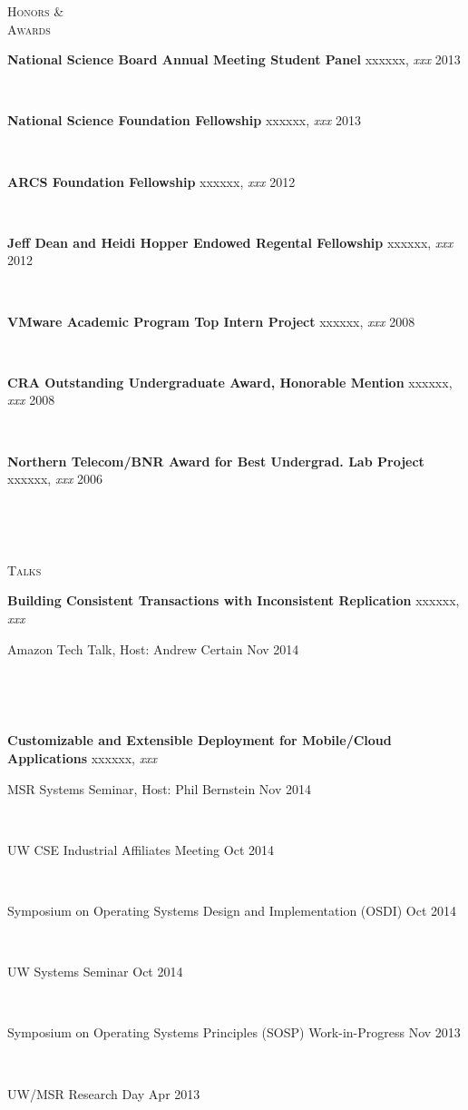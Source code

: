 \documentclass[10pt,times]{report}
\newlength{\sectiongap}
\newlength{\entrygap}
\newlength{\sectioncolwidth}
\newlength{\colgap}
\newlength{\stuffwidth}
\def\ifEqString#1#2{\def\testa{#1}\def\testb{#2}%
  \ifx\testa\testb}
\newenvironment{rtable}{
  \begin{minipage}{\textwidth}
  }{
  \end{minipage}
}
\newenvironment{rentry}[3][xxx]{
  \begin{minipage}[t]{\hsize}
    \textbf{#2}\ifEqString{#1}{xxx}\relax\else, \textit{#1}\fi
    \hspace{\stretch{1}} #3 \\
  }{
    \removelastskip
  \end{minipage}
  \\[\entrygap]  %
}
\newcommand{\rline}[2]{
  \begin{minipage}[t]{\hsize}
    #1 \hspace{\stretch{1}} #2
  \end{minipage} \\
}
\newenvironment{rsection}[1]{
  \begin{minipage}[t]{\sectioncolwidth}
    \textsc{#1}
  \end{minipage}
  \hspace{\colgap}
  \begin{minipage}[t]{\stuffwidth}
  }{
    \removelastskip
  \end{minipage}
  \\[\sectiongap]
}
\begin{document}
\begin{rtable}
\begin{rsection}{Honors \&\\Awards}
    \begin{rentry}{National Science Board Annual Meeting Student
        Panel}{2013}
    \end{rentry} \vspace{-0.5em}

    \begin{rentry}{National Science Foundation Fellowship}{2013}
    \end{rentry} \vspace{-0.5em}

    \begin{rentry}{ARCS Foundation Fellowship}{2012}
    \end{rentry} \vspace{-0.5em}

    \begin{rentry}{Jeff Dean and Heidi Hopper Endowed Regental Fellowship}{2012}
    \end{rentry} \vspace{-0.5em}

    \begin{rentry}{VMware Academic Program Top Intern Project}{2008}
    \end{rentry} \vspace{-0.5em}
    
    \begin{rentry}{CRA Outstanding Undergraduate Award, Honorable
      Mention}{2008}
    \end{rentry} \vspace{-0.5em}

    \begin{rentry}{Northern Telecom/BNR Award for Best Undergrad. Lab
        Project}{2006}
    \end{rentry}
  \end{rsection}

  \begin{rsection}{Talks}
    \begin{rentry}{Building Consistent Transactions with Inconsistent
        Replication}{}
      \rline{Amazon Tech Talk, Host: Andrew Certain}{Nov 2014}
    \end{rentry}

    \begin{rentry}{Customizable and Extensible Deployment for
        Mobile/Cloud Applications}{}
      \rline{MSR Systems Seminar, Host: Phil Bernstein}{Nov 2014}
      \rline{UW CSE Industrial Affiliates Meeting}{Oct 2014}
      \rline{Symposium on Operating Systems Design and
        Implementation (OSDI)}{Oct 2014}
      \rline{UW Systems Seminar}{Oct 2014}
      \rline{Symposium on Operating Systems Principles (SOSP) Work-in-Progress}{Nov 2013}
      \rline{UW/MSR Research Day}{Apr 2013}
    \end{rentry}


\end{rsection}
\end{rtable}
\end{document}
